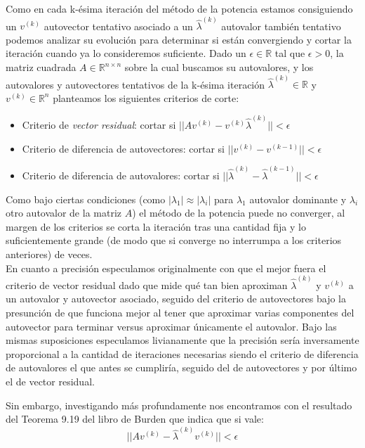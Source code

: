 Como en cada k-ésima iteración del método de la potencia estamos consiguiendo un $v^{(k)}$ autovector tentativo asociado a un $\hat{\lambda}^{(k)}$ autovalor también tentativo podemos analizar su evolución para determinar si están convergiendo y cortar la iteración cuando ya lo consideremos suficiente. Dado un $\epsilon \in \mathds{R}$ tal que $\epsilon > 0$, la matriz cuadrada $A\in \mathds{R}^{n\times n}$ sobre la cual buscamos su autovalores, y los autovalores y autovectores tentativos de la k-ésima iteración $\hat{\lambda}^{(k)} \in \mathds{R}$ y $v^{(k)} \in \mathds{R}^{n}$ planteamos los siguientes criterios de corte:

\begin{itemize}
    \item Criterio de \textit{vector residual}: cortar si $|| A v^{(k)} - v^{(k)}\hat{\lambda}^{(k)} || < \epsilon$
    \item Criterio de diferencia de autovectores: cortar si $|| v^{(k)} - v^{(k-1)} || < \epsilon$
    \item Criterio de diferencia de autovalores: cortar si $|| \hat{\lambda}^{(k)} - \hat{\lambda}^{(k-1)} || < \epsilon$
\end{itemize}

Como bajo ciertas condiciones (como $|\lambda_1| \approx |\lambda_i|$ para $\lambda_1$ autovalor dominante y $\lambda_i$ otro autovalor de la matriz $A$) el método de la potencia puede no converger, al margen de los criterios se corta la iteración tras una cantidad fija y lo suficientemente grande (de modo que si converge no interrumpa a los criterios anteriores) de veces. \\

En cuanto a precisión especulamos originalmente con que el mejor fuera el criterio de vector residual dado que mide qué tan bien aproximan $\hat{\lambda}^{(k)}$ y $v^{(k)}$ a un autovalor y autovector asociado, seguido del criterio de autovectores bajo la presunción de que funciona mejor al tener que aproximar varias componentes del autovector para terminar versus aproximar únicamente el autovalor. Bajo las mismas suposiciones especulamos livianamente que la precisión sería inversamente proporcional a la cantidad de iteraciones necesarias siendo el criterio de diferencia de autovalores el que antes se cumpliría, seguido del de autovectores y por último el de vector residual.

Sin embargo, investigando más profundamente nos encontramos con el resultado del Teorema 9.19 del libro de Burden \cite{Burden} que indica que si vale:
\begin{equation}
||A v^{(k)}-\hat{\lambda}^{(k)}v^{(k)} || < \epsilon
\end{equation}

